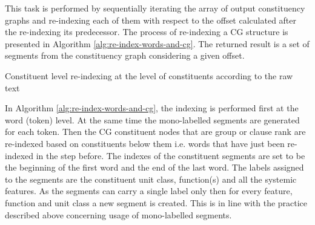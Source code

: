     This task is performed by sequentially iterating the array of output constituency graphs and re-indexing each of them with respect to the offset calculated after the re-indexing its predecessor. The process of re-indexing a CG structure is presented in Algorithm \ref{alg:re-index-words-and-cg}. The returned result is a set of segments from the constituency graph considering a given offset.

    \begin{algorithm}[!ht]
        \caption{Constituent level re-indexing at the level of constituents according to the raw text}
        \label{alg:re-index-words-and-cg}
    \end{algorithm}

    In Algorithm \ref{alg:re-index-words-and-cg}, the indexing is performed first at the word (token) level. At the same time the mono-labelled segments are generated for each token. Then the CG constituent nodes that are group or clause rank are re-indexed based on constituents below them i.e. words that have just been re-indexed in the step before. The indexes of the constituent segments are set to be the beginning of the first word and the end of the last word. The labels assigned to the segments are the constituent unit class, function(s) and all the systemic features. As the segments can carry a single label only then for every feature, function and unit class a new segment is created. This is in line with the practice described above concerning usage of mono-labelled segments.

